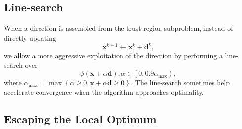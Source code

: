 \documentclass{article}
\newcommand{\x}{\mathbf{x}}
\newcommand{\0}{\textbf{0}}
\newcommand{\tmd}{\mathbf{d}}
\begin{document}
\subsection{Line-search}

When a direction is assembled from the trust-region subproblem, instead of
directly updating
\[ \x^{k + 1} \leftarrow \x^k + \tmd^k, \]
we allow a more aggressive exploitation of the direction by performing a
line-search over
\[ \phi \left( \x + \alpha \tmd \right), \alpha \in \left[ 0, 0.9
   \alpha_{\text{max}} \right), \]
where $\alpha_{\text{max}} = \max \left\{ \alpha \geq 0, \x + \alpha \tmd \geq
\0 \right\}$. The line-search sometimes help accelerate convergence when the
algorithm approaches optimality.

\subsection{Escaping the Local Optimum}
\end{document}
